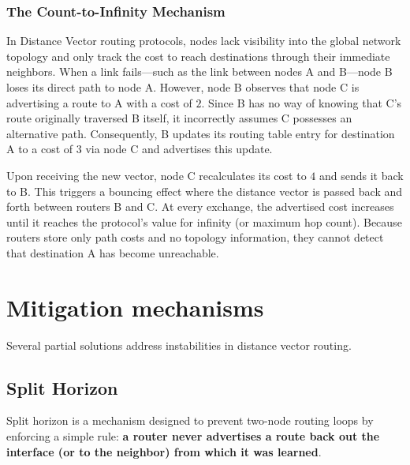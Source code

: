 \subsubsection{The Count-to-Infinity Mechanism}

\begin{center}
\end{center}

In Distance Vector routing protocols, nodes lack visibility into the global network topology and only track the cost to reach destinations through their immediate neighbors. When a link fails—such as the link between nodes A and B—node B loses its direct path to node A. However, node B observes that node C is advertising a route to A with a cost of $2$. Since B has no way of knowing that C's route originally traversed B itself, it incorrectly assumes C possesses an alternative path. Consequently, B updates its routing table entry for destination A to a cost of $3$ via node C and advertises this update.

\begin{center}
\end{center}

Upon receiving the new vector, node C recalculates its cost to $4$ and sends it back to B. This triggers a bouncing effect where the distance vector is passed back and forth between routers B and C. At every exchange, the advertised cost increases until it reaches the protocol's value for infinity (or maximum hop count). Because routers store only path costs and no topology information, they cannot detect that destination A has become unreachable.
\section{Mitigation mechanisms}

Several partial solutions address instabilities in distance vector routing.

\subsection{Split Horizon}

Split horizon is a mechanism designed to prevent two-node routing loops by enforcing a simple rule: \textbf{a router never advertises a route back out the interface (or to the neighbor) from which it was learned}.

